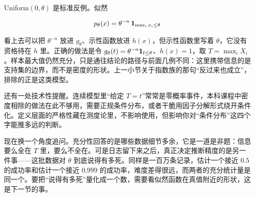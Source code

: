 Uniform\((0,\theta)\) 是标准反例。似然

\[
p_\theta(x)=\theta^{-n}\,\mathbf{1}_{\max_i x_i\le\theta}
\]

看上去可以把 \(\theta^{-n}\) 放进 \(g_\theta\)、示性函数放进 \(h(x)\)，但示性函数里写着 \(\theta\)，它没有资格待在 \(h\) 里。正确的做法是令 \(g_\theta(t)=\theta^{-n}\mathbf{1}_{t\le\theta}\)、\(h(x)=1\)，取 \(T=\max_i X_i\)。样本最大值仍然充分，只是通往结论的路径与前面几例不同：这里携带信息的是支持集的边界，而不是密度的形状。上一小节关于指数族的那句``反过来也成立''，排除的正是这类模型。

还有一处技术性提醒。连续模型里``给定 \(T=t\)''常常是零概率事件，本科课程中密度相除的做法在此不够用，需要正规条件分布，或者干脆用因子分解形式绕开条件化。定义层面的严格性藏在测度论里，不影响使用，但影响你对``条件分布''这四个字能推多远的判断。

现在换一个角度追问。充分性回答的是哪些数据细节多余，它是一道是非题：信息要么全在 \(T\) 里，要么不全在。可是日志留下来之后，真正决定推断精度的是另一件事——这批数据对 \(\theta\) 到底说得有多死。同样是一百万条记录，估计一个接近 \(0.5\) 的成功率和估计一个接近 \(0.999\) 的成功率，难度差得很远，而两者的充分统计量是同一个。要把``说得有多死''量化成一个数，需要看似然函数在真值附近的形状，这是下一节的事。
